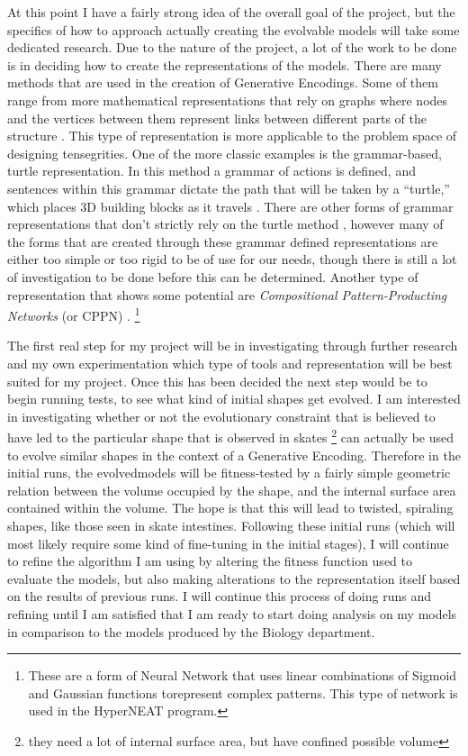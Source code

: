 \documentclass[condensed]{union-cs-thesis}
\begin{document}
At this point I have a fairly strong idea of the overall goal of the project, but the specifics of how
to approach actually creating the evolvable models will take some dedicated research.  Due to the nature
of the project, a lot of the work to be done is in deciding how to create the representations of the
models.  There are many methods that are used in the creation of Generative Encodings.  Some of them
range from more mathematical representations that rely on graphs where nodes and the vertices between
them represent links between different parts of the structure
\cite{rieffel2009automated}.
This type of representation is more applicable to the problem space of designing tensegrities.
One of the more classic examples is the  grammar-based, turtle representation.  In this method a
grammar of actions is defined, and sentences within this grammar dictate the path that will be taken by
a ``turtle,'' which places 3D building blocks as it travels
\cite{hornby2004functional}.
There are other forms of grammar representations that don't strictly rely on the turtle method
\cite{toussaint2003demonstrating},
however many of the forms that are created through these grammar defined representations are either
too simple or too rigid to be of use for our needs, though there is still a lot of investigation to be
done before this can be determined.  Another type of representation that shows some potential are
\emph{Compositional Pattern-Producting Networks} (or CPPN)
\cite{clune2010investigating}.
\footnote{These are a form of Neural Network that uses linear combinations of Sigmoid and Gaussian
  functions torepresent complex patterns.  This type of network is used in the HyperNEAT program.}

\par
The first real step for my project will be in investigating through further research and my own
experimentation which type of tools and representation will be best suited for my project.  Once
this has been decided the next step would be to begin running tests, to see what kind of initial shapes
get evolved.  I am interested in investigating whether or not the evolutionary constraint that is
believed to have led to the particular shape that is observed in skates
\footnote{they need a lot of internal surface area, but have confined possible volume}
can actually be used to evolve similar shapes in the context of a Generative Encoding.  Therefore in
the initial runs, the evolvedmodels will be fitness-tested by a fairly simple geometric relation between
the volume occupied by the shape, and the internal surface area contained within the volume.  The hope
is that this will lead to twisted, spiraling shapes, like those seen in skate intestines.  Following
these initial runs (which will most likely require some kind of fine-tuning in the initial stages), I
will continue to refine the algorithm I am using by altering the fitness function used to evaluate the
models, but also making alterations to the representation itself based on the results of previous runs.
I will continue this process of doing runs and refining until I am satisfied that I am ready to start
doing analysis on my models in comparison to the models produced by the Biology department.
\end{document}
